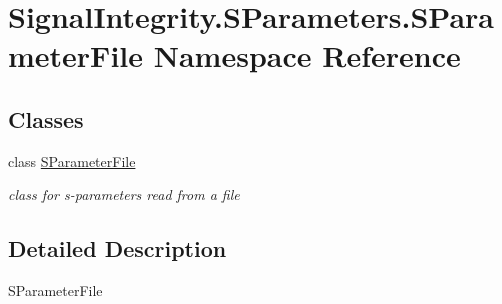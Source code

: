 \hypertarget{namespaceSignalIntegrity_1_1SParameters_1_1SParameterFile}{}\section{Signal\+Integrity.\+S\+Parameters.\+S\+Parameter\+File Namespace Reference}
\label{namespaceSignalIntegrity_1_1SParameters_1_1SParameterFile}
\subsection*{Classes}
\begin{DoxyCompactItemize}
\item 
class \hyperlink{classSignalIntegrity_1_1SParameters_1_1SParameterFile_1_1SParameterFile}{S\+Parameter\+File}
\begin{DoxyCompactList}\small\item\em class for s-\/parameters read from a file \end{DoxyCompactList}\end{DoxyCompactItemize}


\subsection{Detailed Description}
\begin{DoxyVerb}SParameterFile\end{DoxyVerb}
 